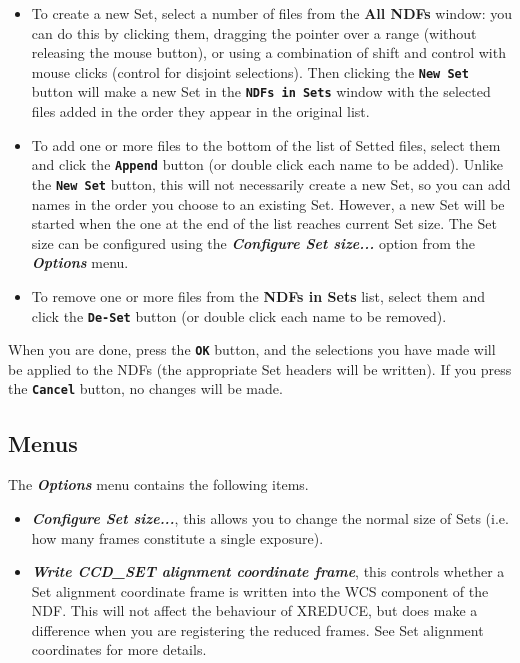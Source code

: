 \documentclass[11pt]{article}
\newcommand{\xref}[3]{#1}
\newcommand{\xlabel}[1]{}
\newcommand{\butt}[1]{{\bf \tt #1}}
\newcommand{\menu}[1]{{\bf \em #1}}
\newcommand{\wlab}[1]{{\bf #1}}
\begin{document}
\begin{itemize}
\item
To create a new Set, select a number of files from the \wlab{All NDFs}
window: you can do this by clicking them, dragging the pointer over 
a range (without releasing the mouse button), or using a combination
of shift and control with mouse clicks (control for disjoint selections).
Then clicking the \butt{New Set} button will make a new Set in the
\butt{NDFs in Sets} window with the selected files added in the order
they appear in the original list.
\item
To add one or more files to the bottom of the list of Setted files,
select them and click the \butt{Append} button
(or double click each name to be added).  
Unlike the \butt{New Set} button, this will not necessarily create
a new Set, so you can add names in the order you choose to an existing Set. 
However, a new Set will be started when the one at the end of the
list reaches current Set size.  The Set size can be configured using
the \menu{Configure Set size...} option from the \menu{Options} menu.
\item
To remove one or more files from the \wlab{NDFs in Sets} list,
select them and click the \butt{De-Set} button
(or double click each name to be removed).
\end{itemize}

When you are done, press the \butt{OK} button, and the selections
you have made will be applied to the NDFs (the appropriate 
Set headers will be written).
If you press the \butt{Cancel} button, no changes will be made.

\subsection{Menus \xlabel{CCDAddSetHeadersMenu}}

The \menu{Options} menu contains the following items.
\begin{itemize}
\item \menu{Configure Set size...},
this allows you to change the normal size of Sets (i.e. how many 
frames constitute a single exposure).
\item \menu{Write CCD\_SET alignment coordinate frame},
this controls whether a Set alignment coordinate frame is written into
the WCS component of the NDF.
This will not affect the behaviour of XREDUCE, but does make a difference
when you are registering the reduced frames.
See \xref{Set alignment coordinates}{sun139}{ccd_set} for more details.
\end{itemize}
\end{document}

